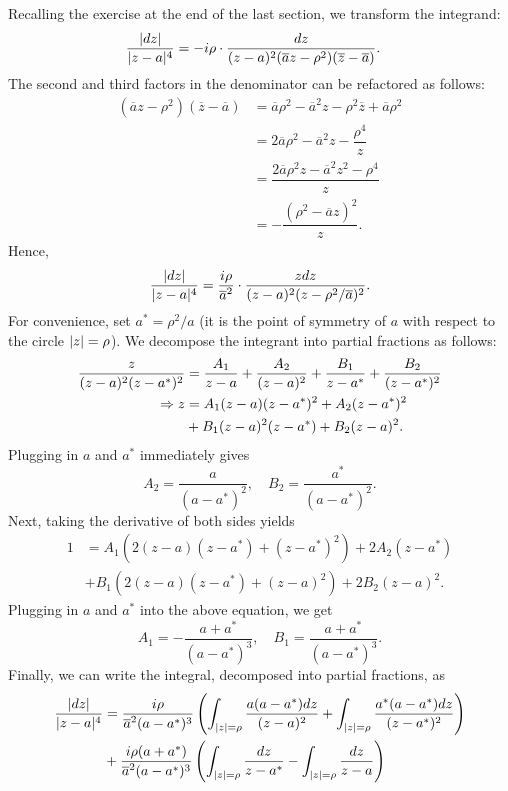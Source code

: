 \begin{exercise}
\begin{sol}
\begin{enumerate}
Recalling the exercise at the end of the last section, we transform the integrand:
\begin{align*}
\dfrac{\lvert dz \rvert}{\lvert z-a \rvert^4} &=-i\rho \cdot \dfrac{dz}{(z-a)^2(\overline{a}z-\rho^2)(\overline{z}-\overline{a})}.
\end{align*}
The second and third factors in the denominator can be refactored as follows:
\begin{align*}
\left(\overline{a}z-\rho^2\right)\left(\overline{z}-\overline{a}\right) &=\overline{a}\rho^2-\overline{a}^2z-\rho^2\overline{z}+\overline{a}\rho^2 \\
&=2\overline{a}\rho^2-\overline{a}^2z-\dfrac{\rho^4}{z} \\
&=\dfrac{2\overline{a}\rho^2z-\overline{a}^2z^2-\rho^4}{z} \\
&=-\dfrac{(\rho^2-\overline{a}z)^2}{z}.
\end{align*}
Hence, $$\dfrac{\lvert dz \rvert}{\lvert z-a \rvert^4}=\dfrac{i\rho}{\overline{a}^2} \cdot \dfrac{zdz}{(z-a)^2(z-\rho^2/\overline{a})^2}.$$ For convenience, set $a^*=\rho^2/a$ (it is the point of symmetry of $a$ with respect to the circle $\lvert z \rvert=\rho$). We decompose the integrant into partial fractions as follows:
\begin{align*}
\dfrac{z}{(z-a)^2(z-a^*)^2} &=\dfrac{A_1}{z-a}+\dfrac{A_2}{(z-a)^2}+\dfrac{B_1}{z-a^*}+\dfrac{B_2}{(z-a^*)^2} \\
\Rightarrow z &=A_1(z-a)(z-a^*)^2+A_2(z-a^*)^2 \\ &+B_1(z-a)^2(z-a^*)+B_2(z-a)^2.
\end{align*}
Plugging in $a$ and $a^*$ immediately gives $$A_2=\dfrac{a}{(a-a^*)^2}, \quad B_2=\dfrac{a^*}{(a-a^*)^2}.$$ Next, taking the derivative of both sides yields
\begin{align*}
1 &=A_1\left(2(z-a)(z-a^*)+(z-a^*)^2\right)+2A_2(z-a^*) \\ &+B_1(2(z-a)(z-a^*)+(z-a)^2)+2B_2(z-a)^2.
\end{align*}
Plugging in $a$ and $a^*$ into the above equation, we get $$A_1=-\dfrac{a+a^*}{(a-a^*)^3}, \quad B_1=\dfrac{a+a^*}{(a-a^*)^3}.$$ Finally, we can write the integral, decomposed into partial fractions, as
\begin{align*}
\dfrac{\abs{dz}}{\abs{z-a}^4} &=\dfrac{i\rho}{\overline{a}^2(a-a^*)^3}\left(\int_{\abs{z}=\rho}\dfrac{a(a-a^*)dz}{(z-a)^2}+\int_{\abs{z}=\rho}\dfrac{a^*(a-a^*)dz}{(z-a^*)^2}\right) \\ &+\dfrac{i\rho(a+a^*)}{\overline{a}^2(a-a^*)^3}\left(\int_{\abs{z}=\rho}\dfrac{dz}{z-a^*}-\int_{\abs{z}=\rho}\dfrac{dz}{z-a}\right) \\

\end{align*}
\end{enumerate}
\end{sol}
\end{exercise}

